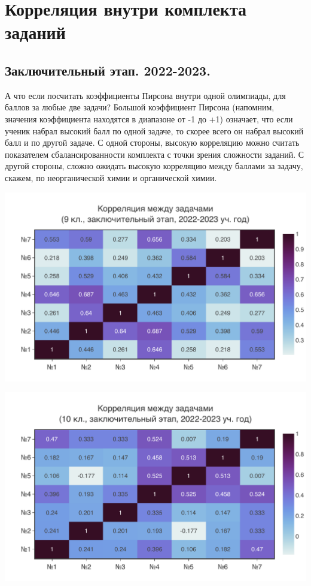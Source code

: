 \section{Корреляция внутри комплекта заданий}

\subsection{Заключительный этап. 2022-2023.}

А что если посчитать коэффициенты Пирсона внутри одной олимпиады, для баллов за любые две задачи? Большой коэффициент Пирсона (напомним, значения коэффициента находятся в диапазоне от -1 до +1) означает, что если ученик набрал высокий балл по одной задаче, то скорее всего он набрал высокий балл и по другой задаче. С одной стороны, высокую корреляцию можно считать показателем сбалансированности комплекта с точки зрения сложности заданий. С другой стороны, сложно ожидать высокую корреляцию между баллами за задачу, скажем, по неорганической химии и органической химии. 

\includegraphics[width=\linewidth]{../export/pdf/results/2023/respa/grade9.pdf}

\newpage

\includegraphics[width=\linewidth]{../export/pdf/results/2023/respa/grade10.pdf}

